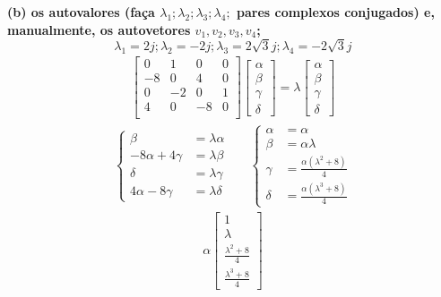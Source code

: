 \documentclass[11pt]{article}
\begin{document}
\textbf{(b) os autovalores (faça $\lambda_1; \lambda_2; \lambda_3; \lambda_4;$ pares complexos conjugados) e, manualmente, os autovetores $v_1, v_2, v_3, v_4$;}
\[
  \lambda_1 = 2j; \lambda_2 = -2j; \lambda_3 = 2\sqrt{3}j; \lambda_4 = -2\sqrt{3}j
\]
\begin{align*}
  \begin{bmatrix}
    0 & 1 & 0 & 0 \\
    -8 & 0 & 4 & 0 \\
    0 & -2 & 0 & 1 \\
    4 & 0 & -8 & 0 \\
  \end{bmatrix}
  \begin{bmatrix}
    \alpha\\
    \beta\\
    \gamma\\
    \delta
  \end{bmatrix}
  =
  \lambda
  \begin{bmatrix}
    \alpha\\
    \beta\\
    \gamma\\
    \delta
  \end{bmatrix}
\end{align*}
\begin{align*}
  \begin{cases}
    \beta  &= \lambda \alpha\\
    -8\alpha + 4\gamma &= \lambda \beta\\
    \delta &= \lambda \gamma \\
    4\alpha - 8\gamma &= \lambda \delta
  \end{cases}
  &
  &
  \begin{cases}
    \alpha &= \alpha\\
    \beta  &= \alpha \lambda\\
    \gamma &= \frac{\alpha (\lambda^2 +8)}{4} \\
    \delta &= \frac{\alpha (\lambda^3 +8)}{4}
  \end{cases}
\end{align*}
\begin{align*}
  \alpha
  \begin{bmatrix}
    1\\
    \lambda\\
    \frac{\lambda^2 +8}{4} \\
    \frac{\lambda^3 +8}{4}
  \end{bmatrix}
\end{align*}
\end{document}
